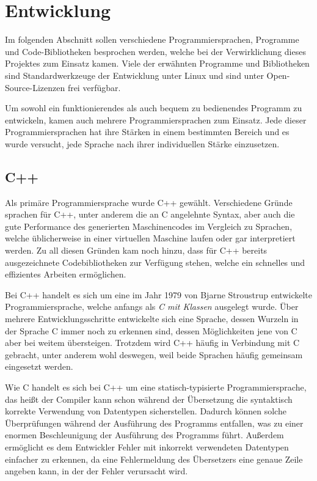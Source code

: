 \chapter{Entwicklung}
Im folgenden Abschnitt sollen verschiedene Programmiersprachen, Programme und Code-Bib\-lio\-theken besprochen werden, welche bei der Verwirklichung dieses Projektes zum Einsatz kamen. 
Viele der erwähnten Programme und Bi\-bli\-o\-the\-ken sind Standardwerkzeuge der Entwicklung unter Linux und sind unter Open-Source-Lizenzen frei verfügbar. 

Um sowohl ein funktionierendes als auch bequem zu bedienendes Programm zu entwickeln, kamen auch mehrere Programmiersprachen zum Einsatz. Jede dieser Programmiersprachen hat ihre Stärken in 
einem bestimmten Bereich und es wurde versucht, jede Sprache nach ihrer individuellen Stärke einzusetzen. 

\section{C++}
\label{sec:cpp}
Als primäre Programmiersprache wurde C++ gewählt. Verschiedene Gründe sprachen für C++, unter anderem die an C angelehnte Syntax, aber
auch die gute Performance des generierten Maschinencodes im Vergleich zu Sprachen, welche üblicherweise in einer virtuellen Maschine laufen oder gar interpretiert werden. Zu 
all diesen Gründen kam noch hinzu, dass für C++ be\-reits ausgezeichnete Codebibliotheken zur Verfügung stehen, welche ein schnelles
und effizientes Arbeiten ermöglichen.

Bei C++ handelt es sich um eine im Jahr 1979 von Bjarne Stroustrup entwickelte Programmiersprache, welche anfangs als \textit{C mit Klassen}
ausgelegt wurde. Über mehrere Ent\-wick\-lungs\-schrit\-te entwickelte sich eine Sprache, dessen Wurzeln in der Sprache C immer noch zu erkennen sind, 
dessen Möglichkeiten jene von C aber bei weitem übersteigen. Trotzdem wird C++ häufig in Verbindung mit C gebracht, unter anderem wohl deswegen, weil beide
Sprachen häufig gemeinsam eingesetzt werden.

Wie C handelt es sich bei C++ um eine statisch-typisierte Programmiersprache, das heißt der Compiler kann schon während der Übersetzung die
syntaktisch korrekte Verwendung von Datentypen sicherstellen. Dadurch können solche Überprüfungen während der Ausführung des Programms
entfallen, was zu einer enormen Beschleunigung der Ausführung des Programms führt. Außerdem ermöglicht es dem Entwickler Fehler mit
inkorrekt verwendeten Datentypen einfacher zu erkennen, da eine Fehlermeldung des Übersetzers eine genaue Zeile angeben kann, in der 
der Fehler verursacht wird. 

